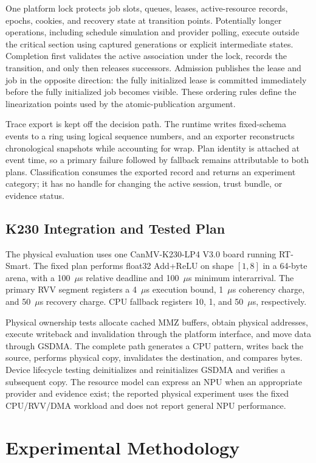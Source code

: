 \documentclass[lettersize,journal]{IEEEtran}
\begin{document}
One platform lock protects job slots, queues, leases, active-resource records,
epochs, cookies, and recovery state at transition points. Potentially longer
operations, including schedule simulation and provider polling, execute outside
the critical section using captured generations or explicit intermediate
states. Completion first validates the active association under the lock,
records the transition, and only then releases successors. Admission publishes
the lease and job in the opposite direction: the fully initialized lease is
committed immediately before the fully initialized job becomes visible. These
ordering rules define the linearization points used by the atomic-publication
argument.

Trace export is kept off the decision path. The runtime writes fixed-schema
events to a ring using logical sequence numbers, and an exporter reconstructs
chronological snapshots while accounting for wrap. Plan identity is attached
at event time, so a primary failure followed by fallback remains attributable
to both plans. Classification consumes the exported record and returns an
experiment category; it has no handle for changing the active session, trust
bundle, or evidence status.

\subsection{K230 Integration and Tested Plan}
The physical evaluation uses one CanMV-K230-LP4 V3.0 board running RT-Smart.
The fixed plan performs float32 Add+ReLU on shape $[1,8]$ in a 64-byte arena,
with a 100~$\mu$s relative deadline and 100~$\mu$s minimum interarrival. The
primary RVV segment registers a 4~$\mu$s execution bound, 1~$\mu$s coherency
charge, and 50~$\mu$s recovery charge. CPU fallback registers 10, 1, and
50~$\mu$s, respectively.

Physical ownership tests allocate cached MMZ buffers, obtain physical
addresses, execute writeback and invalidation through the platform interface,
and move data through GSDMA. The complete path generates a CPU pattern, writes
back the source, performs physical copy, invalidates the destination, and
compares bytes. Device lifecycle testing deinitializes and reinitializes GSDMA
and verifies a subsequent copy. The resource model can express an NPU when an
appropriate provider and evidence exist; the reported physical experiment uses
the fixed CPU/RVV/DMA workload and does not report general NPU performance.

\section{Experimental Methodology}
\end{document}

